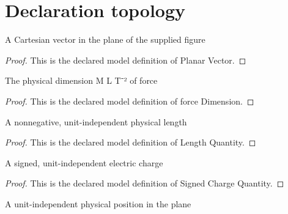 \section{Declaration topology}
\begin{definition}
  \label{def:physics:phyx-mini-0898:phyxminiproblems-problemphyxmini0898-planarvector}
  A Cartesian vector in the plane of the supplied figure
\end{definition}
\begin{proof}
  This is the declared model definition of Planar Vector.
\end{proof}
\begin{definition}
  \label{def:physics:phyx-mini-0898:phyxminiproblems-problemphyxmini0898-forcedimension}
  The physical dimension M L T⁻² of force
\end{definition}
\begin{proof}
  This is the declared model definition of force Dimension.
\end{proof}
\begin{definition}
  \label{def:physics:phyx-mini-0898:phyxminiproblems-problemphyxmini0898-lengthquantity}
  A nonnegative, unit-independent physical length
\end{definition}
\begin{proof}
  This is the declared model definition of Length Quantity.
\end{proof}
\begin{definition}
  \label{def:physics:phyx-mini-0898:phyxminiproblems-problemphyxmini0898-signedchargequantity}
  A signed, unit-independent electric charge
\end{definition}
\begin{proof}
  This is the declared model definition of Signed Charge Quantity.
\end{proof}
\begin{definition}
  \label{def:physics:phyx-mini-0898:phyxminiproblems-problemphyxmini0898-planarpositionquantity}
  A unit-independent physical position in the plane
\end{definition}
